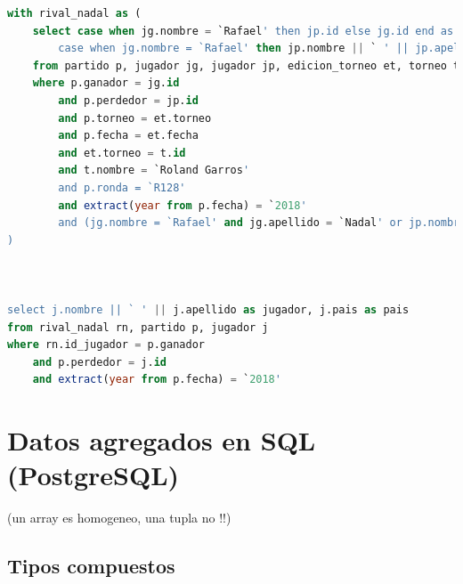 \documentclass[10pt]{opticajnl}
\begin{document}
\begin{lstlisting}[language=SQL]
with rival_nadal as (
	select case when jg.nombre = `Rafael' then jp.id else jg.id end as id_jugador, 
		case when jg.nombre = `Rafael' then jp.nombre || ` ' || jp.apellido else jg.nombre || ` ' || jg.apellido end as jugador
	from partido p, jugador jg, jugador jp, edicion_torneo et, torneo t 
	where p.ganador = jg.id 
		and p.perdedor = jp.id
		and p.torneo = et.torneo 
		and p.fecha = et.fecha
		and et.torneo = t.id 
		and t.nombre = `Roland Garros'
		and p.ronda = `R128'
		and extract(year from p.fecha) = `2018'
		and (jg.nombre = `Rafael' and jg.apellido = `Nadal' or jp.nombre = `Rafael' and jp.apellido = `Nadal') 
)



select j.nombre || ` ' || j.apellido as jugador, j.pais as pais
from rival_nadal rn, partido p, jugador j
where rn.id_jugador = p.ganador 
	and p.perdedor = j.id
	and extract(year from p.fecha) = `2018'

\end{lstlisting}

\section{Datos agregados en SQL (PostgreSQL)}
(un array es homogeneo, una tupla no !!)

\subsection{Tipos compuestos}
\end{document}
